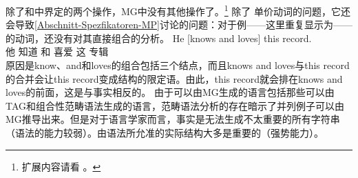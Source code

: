 除了和中界定的两个操作，MG中没有其他操作了。\footnote{%
扩展内容请看 。
}
除了 单价动词的问题，它还会导致\ref{Abschnitt-Spezfikatoren-MP}讨论的问题：对于例——这里重复显示为——的动词，还没有对其直接组合的分析。
\ea
\label{ex-he-knows-and-loves-this-record-MP-zwei}
\gll He [knows and loves] this record.\\
     他 \spacebr{}知道 和 喜爱 这 专辑\\
\z
原因是know、and和loves的组合包括三个结点，而且knows and loves与this record的合并会让this record变成结构的限定语。由此，this record就会排在knows and loves的前面，这是与事实相反的。
由于可以由MG生成的语言包括那些可以由TAG\indextagc 和组合性范畴语法\indexcgc \citep{Michaelis2001a-u}生成的语言，范畴语法分析的存在暗示了并列例子可以由MG推导出来。但是对于语言学家而言，事实是无法生成不太重要的所有字符串（语法的能力较弱）。由语法所允准的实际结构大多是重要的（强势能力）。

